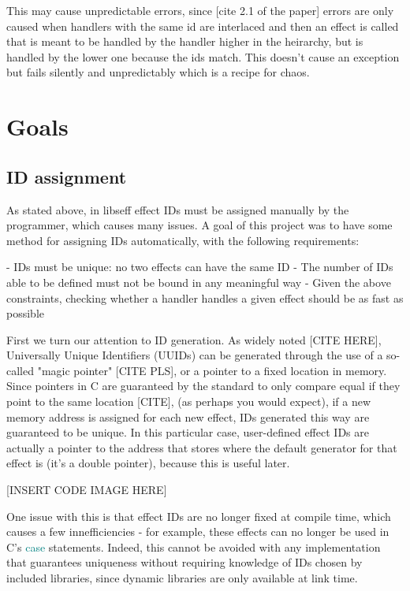 \documentclass[logo,bsc,singlespacing,parskip,online]{infthesis}
\begin{document}
This may cause unpredictable errors, since [cite 2.1 of the paper] errors are only caused when handlers with the same id are interlaced and then an effect is called that is meant to be handled by the handler higher in the heirarchy, but is handled by the lower one because the ids match. This doesn't cause an exception but fails silently and unpredictably which is a recipe for chaos. %

\chapter{Goals}

\section{ID assignment}

As stated above, in libseff effect IDs must be assigned manually by the programmer, which causes many issues. A goal of this project was to have some method for assigning IDs automatically, with the following requirements:

 - IDs must be unique: no two effects can have the same ID
 - The number of IDs able to be defined must not be bound in any meaningful way
 - Given the above constraints, checking whether a handler handles a given effect should be as fast as possible

First we turn our attention to ID generation. As widely noted [CITE HERE], Universally Unique Identifiers (UUIDs) can be generated through the use of a so-called "magic pointer" [CITE PLS], or a pointer to a fixed location in memory. Since pointers in C are guaranteed by the standard to only compare equal if they point to the same location [CITE], (as perhaps you would expect), if a new memory address is assigned for each new effect, IDs generated this way are guaranteed to be unique. In this particular case, user-defined effect IDs are actually a pointer to the address that stores where the default generator for that effect is (it's a double pointer), because this is useful later.

[INSERT CODE IMAGE HERE]

One issue with this is that effect IDs are no longer fixed at compile time, which causes a few innefficiencies - for example, these effects can no longer be used in C's \textcolor{teal}{case} statements. Indeed, this cannot be avoided with any implementation that guarantees uniqueness without requiring knowledge of IDs chosen by included libraries, since dynamic libraries are only available at link time.
\end{document}
